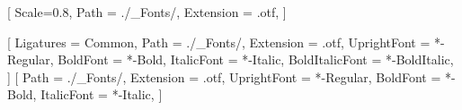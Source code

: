 \usepackage{type1cm}                              %
\usepackage{ragged2e}                             %
\usepackage{fontspec}


                
    
\usepackage{fontawesome}                          %


    
    \setmonofont{LibertinusMono-Regular.otf}[
                 Scale=0.8,
                 Path            = ./_Fonts/,
                 Extension       = .otf,
                ]                
    
    \setmainfont{LibertinusSerif}[%
                 Ligatures       = {Common}, %
                 Path            = ./_Fonts/,
                 Extension       = .otf,
                 UprightFont     = *-Regular,
                 BoldFont        = *-Bold,
                 ItalicFont      = *-Italic,
                 BoldItalicFont  = *-BoldItalic,
                ]
    \setsansfont{LibertinusSans}[
                 Path            = ./_Fonts/,
                 Extension       = .otf,
                 UprightFont     = *-Regular,
                 BoldFont        = *-Bold,
                 ItalicFont      = *-Italic,
                ]
    




